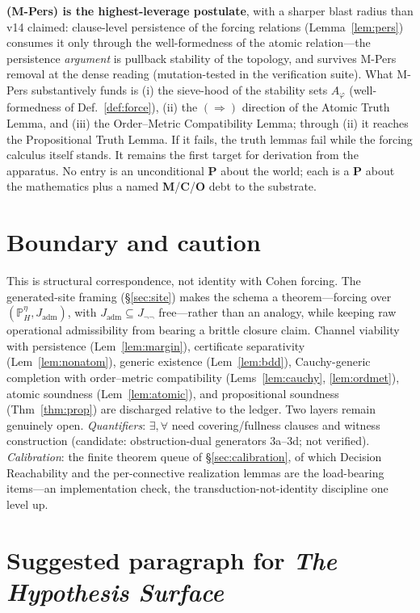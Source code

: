 \documentclass[11pt]{article}
\theoremstyle{definition}
\theoremstyle{remark}
\newcommand{\PHeta}{\mathbb{P}_{H}^{\eta}}
\newcommand{\Jadm}{J_{\mathrm{adm}}}
\newcommand{\Jnn}{J_{\neg\neg}}
\begin{document}
\noindent \textbf{(M-Pers) is the highest-leverage postulate}, with a sharper blast radius than v14
claimed: clause-level persistence of the forcing relations (Lemma~\ref{lem:pers}) consumes it only
through the well-formedness of the atomic relation---the persistence \emph{argument} is pullback
stability of the topology, and survives M-Pers removal at the dense reading (mutation-tested in
the verification suite). What M-Pers substantively funds is (i) the sieve-hood of the stability sets
$A_\varphi$ (well-formedness of Def.~\ref{def:force}), (ii) the $(\Rightarrow)$ direction of the
Atomic Truth Lemma, and (iii) the Order--Metric Compatibility Lemma; through (ii) it reaches the
Propositional Truth Lemma. If it fails, the truth lemmas fail while the forcing calculus itself
stands. It remains the first target for derivation from the apparatus. No entry is an unconditional
\textbf{P} about the world; each is a \textbf{P} about the mathematics plus a named
\textbf{M}/\textbf{C}/\textbf{O} debt to the substrate.

\section{Boundary and caution}

This is structural correspondence, not identity with Cohen forcing. The generated-site framing
(\S\ref{sec:site}) makes the schema a theorem---forcing over $(\PHeta,\Jadm)$, with $\Jadm\subseteq\Jnn$
free---rather than an analogy, while keeping raw operational admissibility from bearing a brittle
closure claim. Channel viability with persistence (Lem~\ref{lem:margin}), certificate separativity
(Lem~\ref{lem:nonatom}), generic existence (Lem~\ref{lem:bdd}), Cauchy-generic completion with
order--metric compatibility (Lems~\ref{lem:cauchy}, \ref{lem:ordmet}), atomic soundness
(Lem~\ref{lem:atomic}), and propositional soundness (Thm~\ref{thm:prop}) are discharged relative to the
ledger. Two layers remain genuinely open. \emph{Quantifiers}: $\exists,\forall$ need covering/fullness
clauses and witness construction (candidate: obstruction-dual generators 3a--3d; not verified).
\emph{Calibration}: the finite theorem queue of \S\ref{sec:calibration}, of which Decision
Reachability and the per-connective realization lemmas are the load-bearing items---an implementation
check, the transduction-not-identity discipline one level up.

\section{Suggested paragraph for \emph{The Hypothesis Surface}}
\end{document}
